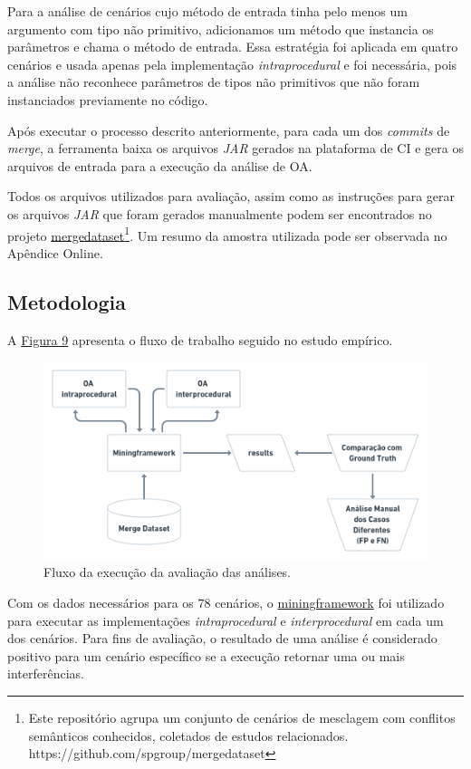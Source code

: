 Para a análise de cenários cujo método de entrada tinha pelo menos um argumento com tipo não primitivo, adicionamos um método que instancia os parâmetros e chama o método de entrada. Essa estratégia foi aplicada em quatro cenários e usada apenas pela implementação \emph{intraprocedural} e foi necessária, pois a análise não reconhece parâmetros de tipos não primitivos que não foram instanciados previamente no código. 

Após executar o processo descrito anteriormente, para cada um dos \emph{commits} de \emph{merge}, a ferramenta baixa os arquivos \emph{JAR} gerados na plataforma de CI e gera os arquivos de entrada para a execução da análise de OA.

Todos os arquivos utilizados para avaliação, assim como as instruções para gerar os arquivos \emph{JAR} que foram gerados manualmente podem ser encontrados no projeto \href{https://github.com/spgroup/mergedataset}{mergedataset}\footnote{Este repositório agrupa um conjunto de cenários de mesclagem com conflitos semânticos conhecidos, coletados de estudos relacionados. https://github.com/spgroup/mergedataset}. Um resumo da amostra utilizada pode ser observada no Apêndice Online.

\subsection{Metodologia}
\label{sec:metodologia}

A \hyperref[fig:fluxo-execucao]{Figura 9} apresenta o fluxo de trabalho seguido no estudo empírico.

\begin{figure}[!h]
    \centering
    \includegraphics[width=0.8\linewidth]{images/Fluxo da avaliação.png}
    \caption{Fluxo da execução da avaliação das análises.}
    \label{fig:fluxo-execucao}
\end{figure}


Com os dados necessários para os 78 cenários, o \href{https://github.com/spgroup/miningframework}{miningframework} foi utilizado para executar as implementações  \emph{intraprocedural} e  \emph{interprocedural} em cada um dos cenários. Para fins de avaliação, o resultado de uma análise é considerado positivo para um cenário específico se a execução retornar uma ou mais interferências.

